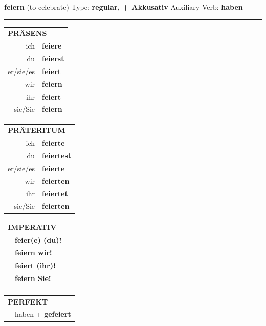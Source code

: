 \documentclass[10pt,a4paper]{revtex4-2}
\begin{document}
\begin{verbbox-acc}
    {\Large \bf feiern} (to celebrate) \hfill Type: \textbf{regular, + Akkusativ} \hfill Auxiliary Verb: \textbf{haben} 
    
     \vspace{5pt}

    \hrule
    
    \vspace{5pt}

  \begin{tabular}{rl}
     \multicolumn{2}{l}{\textbf{PRÄSENS} }\\
    ich & \textbf{feiere}\\
    du & \textbf{feierst}\\
    er/sie/es & \textbf{feiert}\\
    wir & \textbf{feiern}\\
    ihr & \textbf{feiert}\\
    sie/Sie & \textbf{feiern}\\
  \end{tabular}
  \hfill
     \begin{tabular}{rl}
    \multicolumn{2}{l}{\textbf{PRÄTERITUM} }\\
    ich & \textbf{feierte}\\
    du & \textbf{feiertest}\\
    er/sie/es & \textbf{feierte}\\
    wir & \textbf{feierten}\\
    ihr & \textbf{feiertet}\\
    sie/Sie & \textbf{feierten}\\
  \end{tabular}
  \hfill
  \begin{tabular}{rl}
     \multicolumn{2}{l}{\textbf{IMPERATIV} }\\
   & \textbf{feier(e) (du)!}\\
   & \textbf{feiern wir!}\\
   & \textbf{feiert (ihr)!}\\
   & \textbf{feiern Sie!}\\
   & \vspace{10pt}
  \end{tabular}

    \vspace{10pt}

 \begin{tabular}{rl}
     \multicolumn{2}{l}{\textbf{PERFEKT}}\\
 &   haben + \textbf{gefeiert}\\
  \end{tabular}
\hfill
   \begin{tabular}{rl}
   

\end{tabular}
\end{verbbox-acc}
\end{document}

